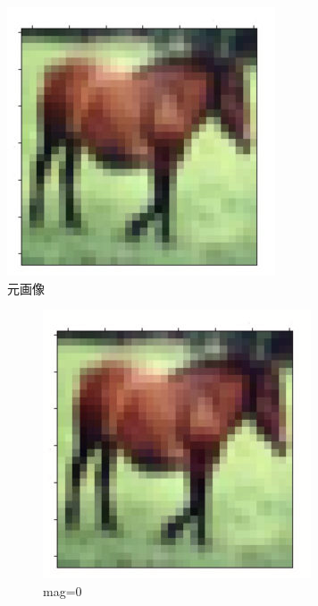\documentclass[onecolumn]{ujarticle}   %
\begin{document}
    \begin{figure}[h]
  		\begin{center}
  			\includegraphics[width=0.3\columnwidth]{transform_test/horse.jpg}
  			\caption{元画像}
  			\label{fig:horse_original}
  		\end{center}
  	\end{figure}

    \begin{figure}[h]
      \vspace{-4mm}
      \centering
      \begin{subfigure}{0.3\columnwidth}
        \centering
        \includegraphics[width=1.0\columnwidth]{transform_test/AutoContrast_0.png}
        \caption{mag=0}
        \label{fig:AutoContrast_0}
      \end{subfigure}
      \begin{subfigure}{0.3\columnwidth}
        \centering

\end{subfigure}
\end{figure}
\end{document}
